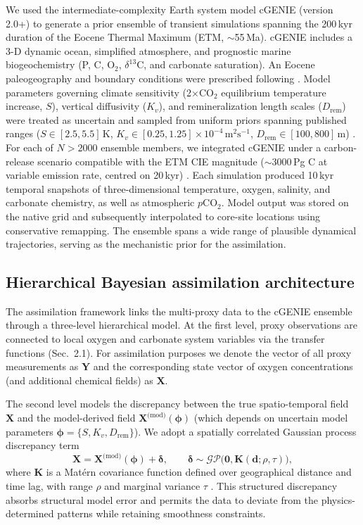 \documentclass{article}
\begin{document}
We used the intermediate-complexity Earth system model cGENIE (version 2.0+) \cite{ridgwell2007cgenie, cao2009} to generate a prior ensemble of transient simulations spanning the 200\,kyr duration of the Eocene Thermal Maximum (ETM, $\sim$55\,Ma). cGENIE includes a 3-D dynamic ocean, simplified atmosphere, and prognostic marine biogeochemistry (P, C, O$_2$, $\delta^{13}$C, and carbonate saturation). An Eocene paleogeography and boundary conditions were prescribed following \cite{lunt2012eocene}. Model parameters governing climate sensitivity (2$\times$CO$_2$ equilibrium temperature increase, $S$), vertical diffusivity ($K_v$), and remineralization length scales ($D_{\text{rem}}$) were treated as uncertain and sampled from uniform priors spanning published ranges ($S \in [2.5, 5.5]\,\text{K}$, $K_v \in [0.25, 1.25] \times 10^{-4}\,\text{m}^2\text{s}^{-1}$, $D_{\text{rem}} \in [100, 800]\,\text{m}$) \cite{kiehl2011sensitivity}. For each of $N>2000$ ensemble members, we integrated cGENIE under a carbon-release scenario compatible with the ETM CIE magnitude ($\sim$3000\,Pg C at variable emission rate, centred on 20\,kyr) \cite{zeebe2013carbon}. Each simulation produced 10\,kyr temporal snapshots of three-dimensional temperature, oxygen, salinity, and carbonate chemistry, as well as atmospheric $p$CO$_2$. Model output was stored on the native grid and subsequently interpolated to core-site locations using conservative remapping. The ensemble spans a wide range of plausible dynamical trajectories, serving as the mechanistic prior for the assimilation.

\subsection{Hierarchical Bayesian assimilation architecture}

The assimilation framework links the multi-proxy data to the cGENIE ensemble through a three-level hierarchical model. At the first level, proxy observations are connected to local oxygen and carbonate system variables via the transfer functions (Sec.~2.1). For assimilation purposes we denote the vector of all proxy measurements as $\mathbf{Y}$ and the corresponding state vector of oxygen concentrations (and additional chemical fields) as $\mathbf{X}$.

The second level models the discrepancy between the true spatio-temporal field $\mathbf{X}$ and the model-derived field $\mathbf{X}^{\text{(mod)}}(\boldsymbol{\phi})$ (which depends on uncertain model parameters $\boldsymbol{\phi} = \{S, K_v, D_{\text{rem}}\}$). We adopt a spatially correlated Gaussian process discrepancy term
\begin{equation}
\mathbf{X} = \mathbf{X}^{\text{(mod)}}(\boldsymbol{\phi}) + \boldsymbol{\delta}, \qquad \boldsymbol{\delta} \sim \mathcal{GP}\big(\mathbf{0}, \mathbf{K}(\mathbf{d}; \rho, \tau) \big),
\end{equation}
where $\mathbf{K}$ is a Mat{\'e}rn covariance function defined over geographical distance and time lag, with range $\rho$ and marginal variance $\tau$ \cite{banerjee2014hierarchical}. This structured discrepancy absorbs structural model error and permits the data to deviate from the physics-determined patterns while retaining smoothness constraints.
\end{document}
